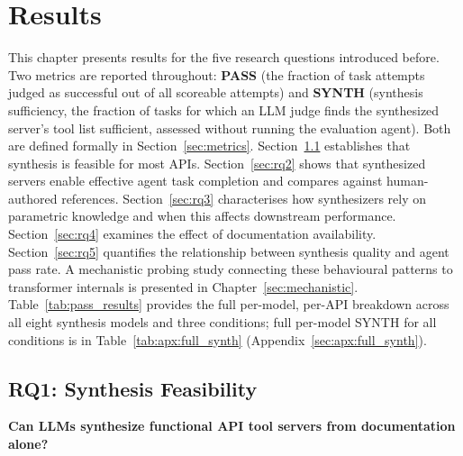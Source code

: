 \chapter{Results}
\label{sec:results}



This chapter presents results for the five research questions introduced before. Two metrics are reported throughout: \textbf{PASS} (the fraction of task attempts judged as successful out of all scoreable attempts) and \textbf{SYNTH} (synthesis sufficiency, the fraction of tasks for which an LLM judge finds the synthesized server's tool list sufficient, assessed without running the evaluation agent). Both are defined formally in Section~\ref{sec:metrics}. Section~\ref{sec:rq1} establishes that synthesis is feasible for most APIs. Section~\ref{sec:rq2} shows that synthesized
servers enable effective agent task completion and compares against human-authored references. Section~\ref{sec:rq3} characterises how synthesizers rely on parametric knowledge and when this affects downstream performance. Section~\ref{sec:rq4} examines the effect of documentation availability. Section~\ref{sec:rq5} quantifies the relationship between
synthesis quality and agent pass rate. A mechanistic probing study connecting these behavioural patterns to transformer internals is presented in Chapter~\ref{sec:mechanistic}.
Table~\ref{tab:pass_results} provides the full per-model, per-API breakdown across all eight synthesis models and three conditions; full per-model SYNTH for all conditions is in Table~\ref{tab:apx:full_synth} (Appendix~\ref{sec:apx:full_synth}).

\section{RQ1: Synthesis Feasibility}
\label{sec:rq1}

\textbf{Can LLMs synthesize functional API tool servers from documentation alone?}

